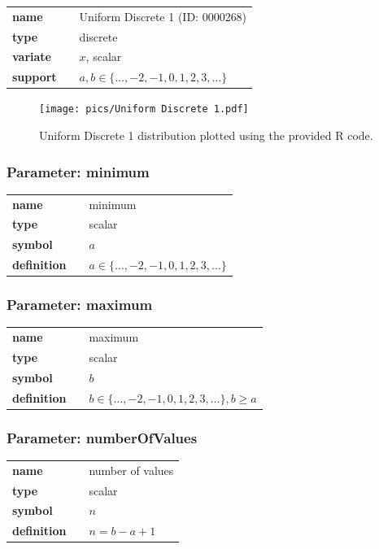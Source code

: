 \documentclass{article}
\begin{document}
  \bigskip 

\begin{tabular}{p{2cm}cl}
\textbf{name} & & Uniform Discrete 1 (ID: 0000268)\\ 
 
\textbf{type} & & discrete \\ 

\textbf{variate} & & $x$, scalar \\ 

\textbf{support} & & $a,b \in \{\dots,-2,-1,0,1,2,3,\dots\}$
\end{tabular}

\begin{figure}[ht!]
\centering
  \texttt{[image: pics/Uniform Discrete 1.pdf]}
 \caption{Uniform Discrete 1 distribution plotted using the provided R code.}
 \label{fig:Uniform Discrete 1}
\end{figure}

\subsubsection*{Parameter: minimum}

\noindent\begin{tabular}{p{2cm}cl}
\textbf{name} & & minimum \\
\textbf{type} & & scalar \\
\textbf{symbol} & & $a$  \\
\textbf{definition} & & $a \in \{\dots,-2,-1,0,1,2,3,\dots\}$
\end{tabular}
\subsubsection*{Parameter: maximum}

\noindent\begin{tabular}{p{2cm}cl}
\textbf{name} & & maximum \\
\textbf{type} & & scalar \\
\textbf{symbol} & & $b$  \\
\textbf{definition} & & $b \in \{\dots,-2,-1,0,1,2,3,\dots\}, b \ge a$
\end{tabular}
\subsubsection*{Parameter: numberOfValues}

\noindent\begin{tabular}{p{2cm}cl}
\textbf{name} & & number of values \\
\textbf{type} & & scalar \\
\textbf{symbol} & & $n$  \\
\textbf{definition} & & $n=b-a+1$
\end{tabular}
\end{document}
